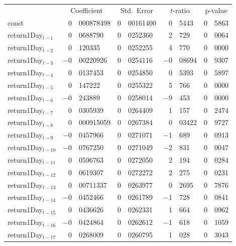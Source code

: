 \begin{center}
\begin{tabular}{lr@{.}lr@{.}lr@{.}lr@{.}l}
    &
    \multicolumn{2}{c}{Coefficient} &
    \multicolumn{2}{c}{Std.\ Error} &
    \multicolumn{2}{c}{$t$-ratio} &
    \multicolumn{2}{c}{p-value} \\[1ex]
const &
    0&000878498 &
    0&00161400 &
        0&5443 &
        0&5863 \\
return1Day$_{t-1}$ &
    0&0688790 &
    0&0252360 &
        2&729 &
        0&0064 \\
return1Day$_{t-2}$ &
    0&120335 &
    0&0252255 &
        4&770 &
        0&0000 \\
return1Day$_{t-3}$ &
    $-$0&00220926 &
    0&0254116 &
        $-$0&08694 &
        0&9307 \\
return1Day$_{t-4}$ &
    0&0137453 &
    0&0254850 &
        0&5393 &
        0&5897 \\
return1Day$_{t-5}$ &
    0&147222 &
    0&0255322 &
        5&766 &
        0&0000 \\
return1Day$_{t-6}$ &
    $-$0&243889 &
    0&0258014 &
        $-$9&453 &
        0&0000 \\
return1Day$_{t-7}$ &
    0&0305939 &
    0&0264409 &
        1&157 &
        0&2474 \\
return1Day$_{t-8}$ &
    0&000915059 &
    0&0267384 &
        0&03422 &
        0&9727 \\
return1Day$_{t-9}$ &
    $-$0&0457966 &
    0&0271071 &
        $-$1&689 &
        0&0913 \\
return1Day$_{t-10}$ &
    $-$0&0767250 &
    0&0271049 &
        $-$2&831 &
        0&0047 \\
return1Day$_{t-11}$ &
    0&0596763 &
    0&0272050 &
        2&194 &
        0&0284 \\
return1Day$_{t-12}$ &
    0&0619307 &
    0&0272272 &
        2&275 &
        0&0231 \\
return1Day$_{t-13}$ &
    0&00711337 &
    0&0263977 &
        0&2695 &
        0&7876 \\
return1Day$_{t-14}$ &
    $-$0&0452466 &
    0&0261789 &
        $-$1&728 &
        0&0841 \\
return1Day$_{t-15}$ &
    0&0436626 &
    0&0262331 &
        1&664 &
        0&0962 \\
return1Day$_{t-16}$ &
    $-$0&0424864 &
    0&0262612 &
        $-$1&618 &
        0&1059 \\
return1Day$_{t-17}$ &
    0&0268009 &
    0&0260795 &
        1&028 &
        0&3043 \\

\end{tabular}
\end{center}
